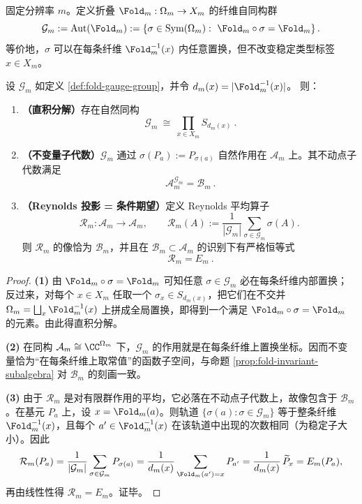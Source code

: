 \begin{definition}\label{def:fold-gauge-group}
固定分辨率 \(m\)。定义折叠 \(\Fold_m:\Omega_m\to X_m\) 的纤维自同构群
\[
\mathcal{G}_m
:=
\mathrm{Aut}(\Fold_m)
:=
\left\{\sigma\in \mathrm{Sym}(\Omega_m):\ \Fold_m\circ \sigma=\Fold_m\right\}.
\]
等价地，\(\sigma\) 可以在每条纤维 \(\Fold_m^{-1}(x)\) 内任意置换，但不改变稳定类型标签 \(x\in X_m\)。
\end{definition}

\begin{proposition}\label{prop:fold-gauge-reynolds}
设 \(\mathcal{G}_m\) 如定义 \ref{def:fold-gauge-group}，并令 \(d_m(x)=|\Fold_m^{-1}(x)|\)。
则：
\begin{enumerate}
  \item \textbf{（直积分解）}存在自然同构
  \[
  \boxed{\ \mathcal{G}_m\ \cong\ \prod_{x\in X_m} S_{d_m(x)}\ }.
  \]
  \item \textbf{（不变量子代数）}\(\mathcal{G}_m\) 通过 \(\sigma(P_a):=P_{\sigma(a)}\) 自然作用在 \(\mathcal{A}_m\) 上。其不动点子代数满足
  \[
  \boxed{\ \mathcal{A}_m^{\mathcal{G}_m}=\mathcal{B}_m\ }.
  \]
  \item \textbf{（Reynolds 投影 = 条件期望）}定义 Reynolds 平均算子
  \[
  \mathcal{R}_m:\mathcal{A}_m\to\mathcal{A}_m,\qquad
  \mathcal{R}_m(A):=\frac{1}{|\mathcal{G}_m|}\sum_{\sigma\in\mathcal{G}_m}\sigma(A).
  \]
  则 \(\mathcal{R}_m\) 的像恰为 \(\mathcal{B}_m\)，并且在 \(\mathcal{B}_m\subset\mathcal{A}_m\) 的识别下有严格恒等式
  \[
  \boxed{\ \mathcal{R}_m=E_m\ }.
  \]
\end{enumerate}
\end{proposition}
\begin{proof}
\textbf{(1)} 由 \(\Fold_m\circ\sigma=\Fold_m\) 可知任意 \(\sigma\in\mathcal{G}_m\) 必在每条纤维内部置换；反过来，对每个 \(x\in X_m\) 任取一个 \(\sigma_x\in S_{d_m(x)}\)，把它们在不交并 \(\Omega_m=\bigsqcup_x \Fold_m^{-1}(x)\) 上拼成全局置换，即得到一个满足 \(\Fold_m\circ\sigma=\Fold_m\) 的元素。由此得直积分解。
\par
\textbf{(2)} 在同构 \(\mathcal{A}_m\cong \CC^{\Omega_m}\) 下，\(\mathcal{G}_m\) 的作用就是在每条纤维上置换坐标。因而不变量恰为“在每条纤维上取常值”的函数子空间，与命题 \ref{prop:fold-invariant-subalgebra} 对 \(\mathcal{B}_m\) 的刻画一致。
\par
\textbf{(3)} 由于 \(\mathcal{R}_m\) 是对有限群作用的平均，它必落在不动点子代数上，故像包含于 \(\mathcal{B}_m\)。在基元 \(P_a\) 上，设 \(x=\Fold_m(a)\)。则轨道 \(\{\sigma(a):\sigma\in\mathcal{G}_m\}\) 等于整条纤维 \(\Fold_m^{-1}(x)\)，且每个 \(a'\in \Fold_m^{-1}(x)\) 在该轨道中出现的次数相同（为稳定子大小）。因此
\[
\mathcal{R}_m(P_a)
=\frac{1}{|\mathcal{G}_m|}\sum_{\sigma\in\mathcal{G}_m}P_{\sigma(a)}
=\frac{1}{d_m(x)}\sum_{\Fold_m(a')=x}P_{a'}
=\frac{1}{d_m(x)}\,\widetilde P_x
=E_m(P_a),
\]
再由线性性得 \(\mathcal{R}_m=E_m\)。证毕。
\end{proof}

